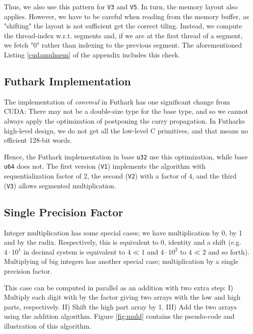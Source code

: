 Thus, we also use this pattern for \texttt{V3} and \texttt{V5}. In turn, the
memory layout also applies. However, we have to be careful when reading from the
memory buffer, as "shifting" the layout is not sufficient get the correct
tiling. Instead, we compute the thread-index w.r.t. segments and, if we are at
the first thread of a segment, we fetch "0" rather than indexing to the previous
segment. The aforementioned Listing \ref{cudamulmem} of the appendix includes
this check.

\subsection{Futhark Implementation}
\label{subsec:mulfut}

The implementation of \textit{convmul} in Futhark has one significant change
from CUDA: There may not be a double-size type for the base type, and so we
cannot always apply the optimization of postponing the carry propagation. In
Futharks high-level design, we do not get all the low-level C primitives, and
that means no efficient 128-bit words.

Hence, the Futhark implementation in base \texttt{u32} use this optimization,
while base \texttt{u64} does not. The first version (\texttt{V1}) implements the
algorithm with sequentialization factor of 2, the second (\texttt{V2}) with a
factor of 4, and the third (\texttt{V3}) allows segmented multiplication.

\subsection{Single Precision Factor}
\label{subsec:mulsin}

Integer multiplication has some special cases; we have multiplication by 0, by 1
and by the radix. Respectively, this is equivalent to 0, identity and a shift
(e.g. $4 \cdot 10^1$ in decimal system is equivalent to $4 \ll 1$ and
$4\cdot 10^2$ to $4\ll 2$ and so forth). Multiplying of big integers has another
special case; multiplication by a single precision factor.

This case can be computed in parallel as an addition with two extra step: I)
Multiply each digit with by the factor giving two arrays with the low and high
parts, respectively. II) Shift the high part array by 1. III) Add the two arrays
using the addition algorithm. Figure \ref{fig:muld} contains the pseudo-code and
illustration of this algorithm.


